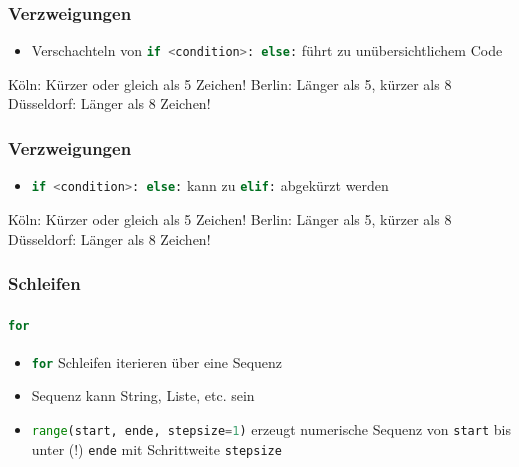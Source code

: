 \documentclass[ngerman]{beamer}
\newcommand{\ta}[1]{\textattachfile[color=1 0 0]{#1}{Code}}
\begin{document}
\begin{frame}[containsverbatim]
\frametitle{Verzweigungen}

\begin{itemize}
\item Verschachteln von \lstinline[language={Python}]{if <condition>: else:} führt zu unübersichtlichem Code
\end{itemize}



\begin{ausgabe}
Köln: Kürzer oder gleich als 5 Zeichen!
Berlin: Länger als 5, kürzer als 8
Düsseldorf: Länger als 8 Zeichen!
\end{ausgabe}

\end{frame}

\begin{frame}[containsverbatim]
\frametitle{Verzweigungen}

\begin{itemize}
\item \lstinline[language={Python}]{if <condition>: else:} kann zu \lstinline[language={Python}]{elif:} abgekürzt werden
\end{itemize}



\begin{ausgabe}
Köln: Kürzer oder gleich als 5 Zeichen!
Berlin: Länger als 5, kürzer als 8
Düsseldorf: Länger als 8 Zeichen!
\end{ausgabe}


\end{frame}







\begin{frame}[containsverbatim]
\frametitle{Schleifen}
\framesubtitle{\lstinline[language={Python}]{for}}

\begin{itemize}
\item \lstinline[language={Python}]{for} Schleifen iterieren über eine Sequenz
\item Sequenz kann String, Liste, etc. sein
\item \lstinline[language={Python}]{range(start, ende, stepsize=1)} erzeugt numerische Sequenz von \texttt{start} bis unter (!) \texttt{ende} mit Schrittweite \texttt{stepsize}
\end{itemize}



\end{frame}
\end{document}

